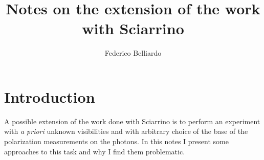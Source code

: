 \documentclass[aps, pra, 10pt, twocolumn, superscriptaddress,floatfix]{revtex4-1}
\begin{document}
%
\title{Notes on the extension of the work with Sciarrino} 
%

\author{Federico Belliardo}


\maketitle

\section{Introduction}
%
A possible extension of the work done with Sciarrino is to perform an experiment with \textit{a priori} unknown visibilities and with arbitrary choice of the base of the polarization measurements on the photons. In this notes I present some approaches to this task and why I find them problematic.
\end{document}

